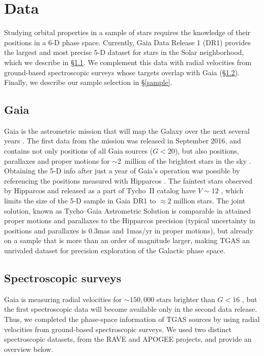 \documentclass[apj, twocolappendix, numberedappendix, appendixfloats]{emulateapj}
\begin{document}
\section{Data}
Studying orbital properties in a sample of stars requires the knowledge of their positions in a 6-D phase space.
Currently, Gaia Data Release 1 (DR1) provides the largest and most precise 5-D dataset for stars in the Solar neighborhood, which we describe in \S\ref{gaia}.
We complement this data with radial velocities from ground-based spectroscopic surveys whose targets overlap with Gaia (\S\ref{rvsurveys}).
Finally, we describe our sample selection in \S\ref{sample}.

\subsection{Gaia}
\label{gaia}
Gaia is the astrometric mission that will map the Galaxy over the next several years \citep{perryman2001}.
The first data from the mission was released in September 2016, and contains not only positions of all Gaia sources ($G<20$), but also positions, parallaxes and proper motions for $\sim$2~million of the brightest stars in the sky \citep{gaiadr1, gaiamission}.
Obtaining the 5-D info after just a year of Gaia's operation was possible by referencing the positions measured with Hipparcos \citep{michalik2015}.
The faintest stars observed by Hipparcos \citep{hipparcos, vleeuwen2007} and released as a part of Tycho~II catalog have $V\sim12$ \citep{hog2000}, which limits the size of the 5-D sample in Gaia DR1 to $\approx2$ million stars.
The joint solution, known as Tycho--Gaia Astrometric Solution \citep[TGAS,][]{gaiaastrometry} is comparable in attained proper motions and parallaxes to the Hipparcos precision (typical uncertainty in positions and parallaxes is 0.3\;mas and 1\;mas/yr in proper motions), but already on a sample that is more than an order of magnitude larger, making TGAS an unrivaled dataset for precision exploration of the Galactic phase space.

\subsection{Spectroscopic surveys}
\label{rvsurveys}
Gaia is measuring radial velocities for $\sim150,000$ stars brighter than $G<16$ \citep{gaiamission}, but the first spectroscopic data will become available only in the second data release.
Thus, we completed the phase-space information of TGAS sources by using radial velocities from ground-based spectroscopic surveys.
We used two distinct spectroscopic datasets, from the RAVE and APOGEE projects, and provide an overview below.
\end{document}
